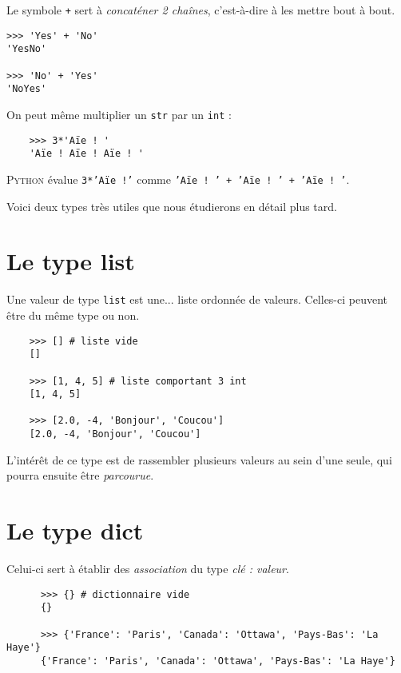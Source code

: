 Le symbole \texttt{+} sert à \textit{concaténer 2 chaînes}, c'est-à-dire à les mettre bout à bout.  

\begin{pys}\begin{verbatim}
>>> 'Yes' + 'No'
'YesNo'

>>> 'No' + 'Yes'
'NoYes'
\end{verbatim}
\end{pys}

On peut même multiplier un \texttt{str} par un \texttt{int} :
\begin{pyc}
  \begin{verbatim}
    >>> 3*'Aïe ! '
    'Aïe ! Aïe ! Aïe ! '
  \end{verbatim}
\end{pyc}
\textsc{Python} évalue \texttt{3*'Aïe !'} comme \texttt{'Aïe ! ' + 'Aïe ! ' + 'Aïe ! '}.


Voici deux types très utiles que nous étudierons en détail plus tard.

\section{Le type list}

Une valeur de type \texttt{list} est une... liste ordonnée de valeurs. Celles-ci peuvent être du même type ou non.

\begin{pyc}
  \begin{verbatim}
    >>> [] # liste vide
    []

    >>> [1, 4, 5] # liste comportant 3 int
    [1, 4, 5]

    >>> [2.0, -4, 'Bonjour', 'Coucou']
    [2.0, -4, 'Bonjour', 'Coucou']
  \end{verbatim}
\end{pyc}

L'intérêt de ce type est de rassembler plusieurs valeurs au sein d'une seule, qui pourra ensuite être \textit{parcourue}.

\section{Le type dict}

Celui-ci sert à établir des \textit{association} du type \textit{clé : valeur}.

\begin{pyc}
    \begin{verbatim}
      >>> {} # dictionnaire vide
      {}

      >>> {'France': 'Paris', 'Canada': 'Ottawa', 'Pays-Bas': 'La Haye'}
      {'France': 'Paris', 'Canada': 'Ottawa', 'Pays-Bas': 'La Haye'}
    \end{verbatim}
  \end{pyc}  

